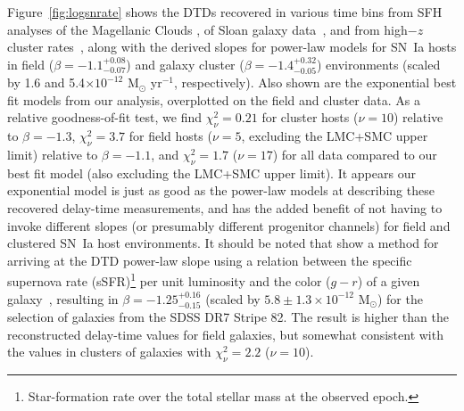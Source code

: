 \documentclass[apj, twocolumn]{aastex62}
\begin{document}
Figure~\ref{fig:logsnrate} shows the DTDs recovered in various time bins from SFH analyses of the Magellanic Clouds \citep{Maoz:2010}, of Sloan galaxy data~\citep{Maoz:2010a, Maoz:2011, Maoz:2012a,Graur:2013}, and from high$-z$ cluster rates~\citep{Friedmann:2018hq}, along with the derived  slopes for power-law models for SN~Ia hosts in field ($\beta=-1.1^{+0.08}_{-0.07}$) and galaxy cluster ($\beta=-1.4^{+0.32}_{-0.05}$) environments {(scaled by 1.6 and 5.4$\times10^{-12}$ M$_{\odot}$ yr$^{-1}$, respectively)}. Also shown are the exponential best fit models from our analysis, overplotted on the field and cluster data. As a relative goodness-of-fit test, we find  $\chi^2_{\nu}=0.21$ for cluster hosts ($\nu=10$) relative to $\beta=-1.3$, $\chi^2_{\nu}=3.7$ for field hosts ({$\nu=5$}, excluding the LMC+SMC upper limit) relative to $\beta=-1.1$, and $\chi^2_{\nu}=1.7$ ($\nu=17$) for all data compared to our best fit model (also excluding the LMC+SMC upper limit). It appears our exponential model is just as good as the power-law models at describing these recovered delay-time measurements, and has the added benefit of not having to invoke different slopes (or presumably different progenitor channels) for field and clustered SN~Ia host environments. {It should be noted that \cite{Heringer:2019ws} show a method for arriving at the DTD power-law slope using a relation between the specific supernova rate (sSFR)\footnote{Star-formation rate over the total stellar mass at the observed epoch.}  per unit luminosity and the color ($g-r$) of a given galaxy~\citep{Heringer:2017fp}, resulting in $\beta=-1.25^{+0.16}_{-0.15}$ (scaled by $5.8\pm1.3\times10^{-12}$ M$_{\odot}$) for the selection of galaxies from the SDSS DR7 Stripe 82. The result is higher than the reconstructed delay-time values for field galaxies, but somewhat consistent with the values in clusters of galaxies with $\chi^2_{\nu}=2.2$ ($\nu=10$). }
\end{document}
